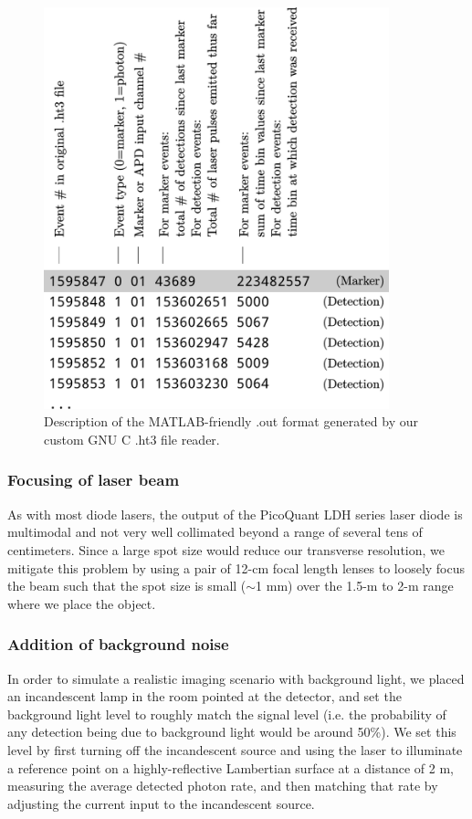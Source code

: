 \begin{figure}[htb]
\centerline{\includegraphics[width=10cm]{figure-first-outformat.pdf}}
\caption{Description of the MATLAB-friendly .out format generated by our custom GNU C .ht3 file reader.}
\label{figure:first-outformat}
\end{figure}

\subsubsection{Focusing of laser beam}
As with most diode lasers, the output of the PicoQuant LDH series laser diode is multimodal and not very well collimated beyond a range of several tens of centimeters. Since a large spot size would reduce our transverse resolution, we mitigate this problem by using a pair of 12-cm focal length lenses to loosely focus the beam such that the spot size is small ($\sim$1 mm) over the 1.5-m to 2-m range where we place the object.

\subsubsection{Addition of background noise}
In order to simulate a realistic imaging scenario with background light, we placed an incandescent lamp in the room pointed at the detector, and set the background light level to roughly match the signal level (i.e. the probability of any detection being due to background light would be around 50\%). We set this level by first turning off the incandescent source and using the laser to illuminate a reference point on a highly-reflective Lambertian surface at a distance of 2 m, measuring the average detected photon rate, and then matching that rate by adjusting the current input to the incandescent source.

